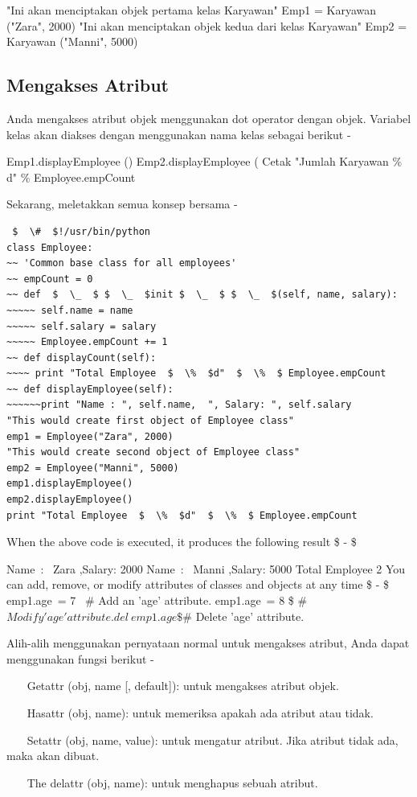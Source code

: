 "Ini akan menciptakan objek pertama kelas Karyawan"
Emp1 = Karyawan ("Zara", 2000)
"Ini akan menciptakan objek kedua dari kelas Karyawan"
Emp2 = Karyawan ("Manni", 5000)


\subsection{Mengakses Atribut}
Anda mengakses atribut objek menggunakan dot operator dengan objek. Variabel kelas akan diakses dengan menggunakan nama kelas sebagai berikut -

Emp1.displayEmployee ()
Emp2.displayEmployee (
Cetak "Jumlah Karyawan $  \%  $ d" $  \%  $ Employee.empCount

Sekarang, meletakkan semua konsep bersama -
\begin{verbatim}
 $  \#  $!/usr/bin/python
class Employee:
~~ 'Common base class for all employees'
~~ empCount = 0
~~ def  $  \_  $ $  \_  $init $  \_  $ $  \_  $(self, name, salary):
~~~~~ self.name = name
~~~~~ self.salary = salary
~~~~~ Employee.empCount += 1
~~ def displayCount(self):
~~~~ print "Total Employee  $  \%  $d"  $  \%  $ Employee.empCount
~~ def displayEmployee(self):
~~~~~~print "Name : ", self.name,  ", Salary: ", self.salary
"This would create first object of Employee class"
emp1 = Employee("Zara", 2000)
"This would create second object of Employee class"
emp2 = Employee("Manni", 5000)
emp1.displayEmployee()
emp2.displayEmployee()
print "Total Employee  $  \%  $d"  $  \%  $ Employee.empCount
\end{verbatim}
When the above code is executed, it produces the following result  \$ - \$

Name~:~ Zara ,Salary:  2000
Name~:~ Manni ,Salary:  5000
Total Employee 2
You can add, remove, or modify attributes of classes and objects at any time  \$ - \$
emp1.age~= 7  \ $  \#  $ Add an 'age' attribute.
emp1.age~= 8   \$  \#  $ Modify 'age' attribute.
del~emp1.age  \$  \#  $ Delete 'age' attribute.

Alih-alih menggunakan pernyataan normal untuk mengakses atribut, Anda dapat menggunakan fungsi berikut -

~~~ Getattr (obj, name [, default]): untuk mengakses atribut objek.

~~~ Hasattr (obj, name): untuk memeriksa apakah ada atribut atau tidak.


~~~ Setattr (obj, name, value): untuk mengatur atribut. Jika atribut tidak ada, maka akan dibuat.


~~~ The delattr (obj, name): untuk menghapus sebuah atribut.



